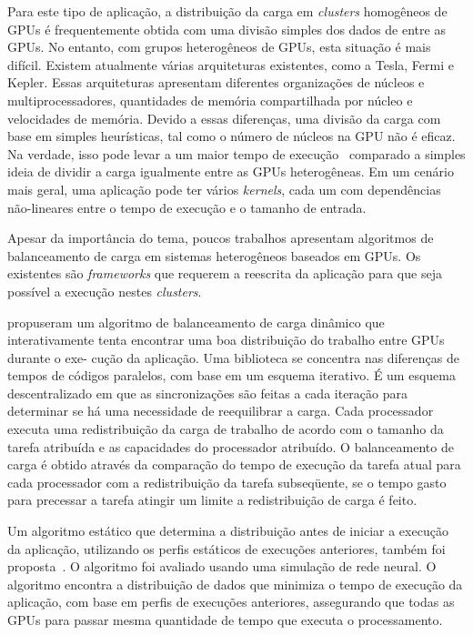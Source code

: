 Para este tipo de aplicação, a distribuição da carga em \emph{clusters}
homogêneos de GPUs é frequentemente obtida com uma divisão simples dos dados de
entre as GPUs. No entanto, com grupos heterogêneos de GPUs, esta situação é mais
difícil. Existem atualmente várias arquiteturas existentes, como a Tesla, Fermi
e Kepler. Essas arquiteturas apresentam diferentes organizações de núcleos e
multiprocessadores, quantidades de memória compartilhada por núcleo e
velocidades de memória. Devido a essas diferenças, uma divisão da carga com base
em simples heurísticas, tal como o número de núcleos na GPU não é eficaz. Na
verdade, isso pode levar a um maior tempo de execução~\citep{raphael} comparado a
simples ideia de dividir a carga igualmente entre as GPUs heterogêneas. Em um
cenário mais geral, uma aplicação pode ter vários \emph{kernels}, cada um com
dependências não-lineares entre o tempo de execução e o tamanho de entrada.

Apesar da importância do tema, poucos trabalhos apresentam algoritmos de
balanceamento de carga em sistemas heterogêneos baseados em GPUs. Os existentes
são \emph{frameworks} que requerem a reescrita da aplicação para que seja
possível a execução nestes \emph{clusters}.

\citep{acosta} propuseram um algoritmo de balanceamento de carga dinâmico que interativamente tenta encontrar uma boa distribuição do trabalho entre GPUs durante o exe- cução da aplicação. Uma biblioteca se concentra nas diferenças de tempos de códigos paralelos, com base em um esquema iterativo. É um esquema descentralizado em que as sincronizações são feitas a cada iteração para determinar se há uma necessidade de reequilibrar a carga. Cada processador executa uma redistribuição da carga de trabalho de acordo com o tamanho da tarefa atribuída e as capacidades do processador atribuído. O balanceamento de carga é obtido através da comparação do tempo de execução da tarefa atual para cada processador com a redistribuição da tarefa subseqüente, se o tempo gasto para precessar a tarefa atingir um limite a redistribuição de carga é feito. 

Um algoritmo estático que determina a distribuição antes de iniciar a execução da aplicação, utilizando os perfis estáticos de execuções anteriores, também foi proposta~\citep{raphael}. O algoritmo foi avaliado usando uma simulação de rede neural. O algoritmo encontra a distribuição de dados que minimiza o tempo de execução da aplicação, com base em perfis de execuções anteriores, assegurando que todas as GPUs para passar mesma quantidade de tempo que executa o processamento. 

